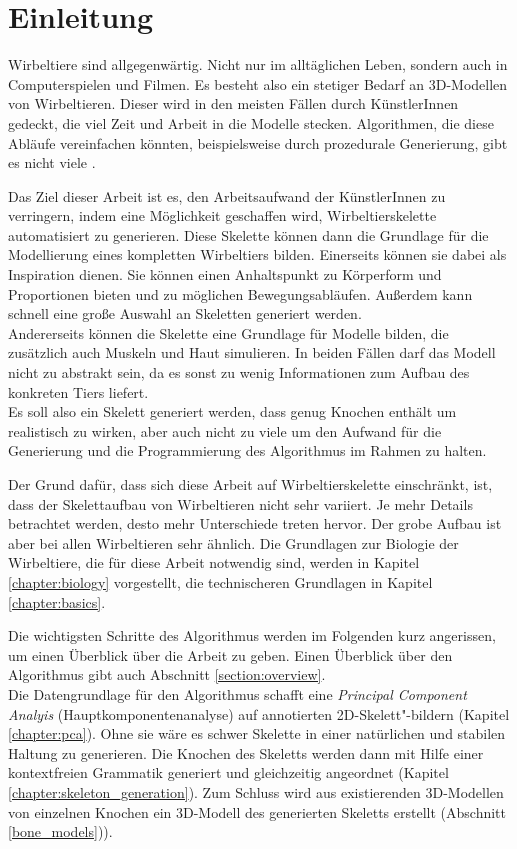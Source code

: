 \chapter{Einleitung}

Wirbeltiere sind allgegenwärtig. Nicht nur im alltäglichen Leben, sondern auch in Computerspielen und Filmen. Es besteht also ein stetiger Bedarf an 3D-Modellen von Wirbeltieren. Dieser wird in den meisten Fällen durch KünstlerInnen gedeckt, die viel Zeit und Arbeit in die Modelle stecken. Algorithmen, die diese Abläufe vereinfachen könnten, beispielsweise durch prozedurale Generierung, gibt es nicht viele \cite{PCGSurvey_videoGames}.

Das Ziel dieser Arbeit ist es, den Arbeitsaufwand der KünstlerInnen zu verringern, indem eine Möglichkeit geschaffen wird, Wirbeltierskelette automatisiert zu generieren. Diese Skelette können dann die Grundlage für die Modellierung eines kompletten Wirbeltiers bilden.
Einerseits können sie dabei als Inspiration dienen. Sie können einen Anhaltspunkt zu Körperform und Proportionen bieten und zu möglichen Bewegungsabläufen. Außerdem kann schnell eine große Auswahl an Skeletten generiert werden.\\
Andererseits können die Skelette eine Grundlage für Modelle bilden, die zusätzlich auch Muskeln und Haut simulieren.
In beiden Fällen darf das Modell nicht zu abstrakt sein, da es sonst zu wenig Informationen zum Aufbau des konkreten Tiers liefert.\\
Es soll also ein Skelett generiert werden, dass genug Knochen enthält um realistisch zu wirken, aber auch nicht zu viele um den Aufwand für die Generierung und die Programmierung des Algorithmus im Rahmen zu halten.

Der Grund dafür, dass sich diese Arbeit auf Wirbeltierskelette einschränkt, ist, dass der Skelettaufbau von Wirbeltieren nicht sehr variiert. 
Je mehr Details betrachtet werden, desto mehr Unterschiede treten hervor. Der grobe Aufbau ist aber bei allen Wirbeltieren sehr ähnlich. Die Grundlagen zur Biologie der Wirbeltiere, die für diese Arbeit notwendig sind, werden in Kapitel \ref{chapter:biology} vorgestellt, die technischeren Grundlagen in Kapitel \ref{chapter:basics}.

Die wichtigsten Schritte des Algorithmus werden im Folgenden kurz angerissen, um einen Überblick über die Arbeit zu geben. Einen Überblick über den Algorithmus gibt auch Abschnitt \ref{section:overview}.\\
Die Datengrundlage für den Algorithmus schafft eine \emph{Principal Component Analyis} (Hauptkomponentenanalyse) auf annotierten 2D-Skelett"-bildern (Kapitel \ref{chapter:pca}). Ohne sie wäre es schwer Skelette in einer natürlichen und stabilen Haltung zu generieren.
Die Knochen des Skeletts werden dann mit Hilfe einer kontextfreien Grammatik generiert und gleichzeitig angeordnet (Kapitel \ref{chapter:skeleton_generation}). 
Zum Schluss wird aus existierenden 3D-Modellen von einzelnen Knochen ein 3D-Modell des generierten Skeletts erstellt (Abschnitt \ref{bone_models})).

